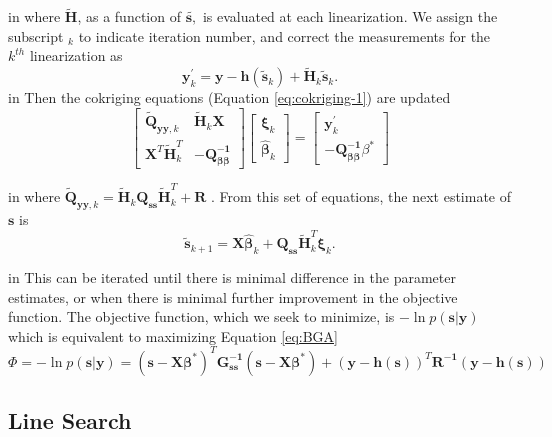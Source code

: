 \documentclass[11pt,oneside,onecolumn]{usgsreport}
\begin{document}
\begin{appendix}
 in
where $\mathbf{\tilde{H}}$, as a function of $\mathbf{\tilde{s,}}$
is evaluated at each linearization. We assign the subscript $_{k}$
to indicate iteration number, and correct the measurements for the
$k^{th}$ linearization as 
\[
\mathbf{y}_{k}^{'}=\mathbf{y}-\mathbf{h}(\tilde{\mathbf{s}}_{k})+\tilde{\mathbf{H}}_{k}\tilde{\mathbf{s}}_{k}.
\]
 in
Then the cokriging equations (Equation \ref{eq:cokriging-1}) are
updated
\begin{equation}
\left[\begin{array}{cc}
\tilde{\mathbf{Q}}_{\mathbf{yy},k} & \tilde{\mathbf{H}}_{k}\mathbf{X}\\
\mathbf{X}^{T}\tilde{\mathbf{H}}_{k}^{T} & \mathbf{-}\mathbf{Q_{\beta\beta}^{-1}}
\end{array}\right]\left[\begin{array}{c}
\mathbf{\xi}_{k}\\
\hat{\mathbf{\beta}}_{k}
\end{array}\right]=\left[\begin{array}{c}
\mathbf{y}_{k}^{'}\\
\mathbf{-}\mathbf{Q_{\beta\beta}^{-1}}\beta^{*}
\end{array}\right]\label{eq:iterations-1}
\end{equation}

 in
where $\tilde{\mathbf{Q}}_{\mathbf{yy},k}=\tilde{\mathbf{H}}_{k}\mathbf{Q_{ss}}\tilde{\mathbf{H}}_{k}^{T}+\mathbf{R}$
. From this set of equations, the next estimate of $\mathbf{s}$ is
\[
\tilde{\mathbf{s}}_{k+1}=\mathbf{X\hat{\beta}}_{k}+\mathbf{Q_{ss}}\tilde{\mathbf{H}}_{k}^{T}\mathbf{\xi}_{k}.
\]

 in
This can be iterated until there is minimal difference in the parameter
estimates, or when there is minimal further improvement in the objective
function. The objective function, which we seek to minimize, is $\mathbf{-}\ln p\left(\mathbf{s|y}\right)$
which is equivalent to maximizing Equation \ref{eq:BGA}
\[
\Phi=\mathbf{-}\ln p\left(\mathbf{s|y}\right)=(\mathbf{s-X\beta}^{*})^{T}\mathbf{G_{\mathbf{ss}}^{-1}}(\mathbf{s-X\beta^{*}})+\left(\mathbf{y-h}(\mathbf{s})\right)^{T}\mathbf{R^{-1}\left(\mathbf{y-h}(\mathbf{s})\right)}
\]



\subsection{Line Search}


\end{appendix}
\end{document}
